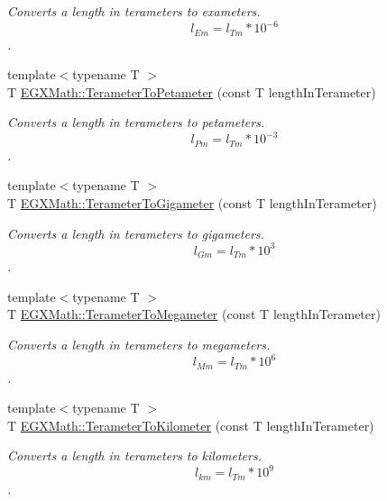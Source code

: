 \begin{DoxyCompactItemize}
\begin{DoxyCompactList}\small\item\em Converts a length in terameters to exameters. \[ l_{Em}=l_{Tm} * 10^{-6} \]. \end{DoxyCompactList}\item 
{\footnotesize template$<$typename T $>$ }\\T \mbox{\hyperlink{group___e_g_x_math-_conversions-_length_conversions-_s_i-_terameter-_s_i_ga0e5474db8b07f9fd87fa6539a02af527}{E\+G\+X\+Math\+::\+Terameter\+To\+Petameter}} (const T length\+In\+Terameter)
\begin{DoxyCompactList}\small\item\em Converts a length in terameters to petameters. \[ l_{Pm}=l_{Tm} * 10^{-3} \]. \end{DoxyCompactList}\item 
{\footnotesize template$<$typename T $>$ }\\T \mbox{\hyperlink{group___e_g_x_math-_conversions-_length_conversions-_s_i-_terameter-_s_i_gaf7d05e4ba6ba85ee7c75c65647178cb8}{E\+G\+X\+Math\+::\+Terameter\+To\+Gigameter}} (const T length\+In\+Terameter)
\begin{DoxyCompactList}\small\item\em Converts a length in terameters to gigameters. \[ l_{Gm}=l_{Tm} * 10^{3} \]. \end{DoxyCompactList}\item 
{\footnotesize template$<$typename T $>$ }\\T \mbox{\hyperlink{group___e_g_x_math-_conversions-_length_conversions-_s_i-_terameter-_s_i_gad4a32011802c13e60cc98081113d52c1}{E\+G\+X\+Math\+::\+Terameter\+To\+Megameter}} (const T length\+In\+Terameter)
\begin{DoxyCompactList}\small\item\em Converts a length in terameters to megameters. \[ l_{Mm}=l_{Tm} * 10^{6} \]. \end{DoxyCompactList}\item 
{\footnotesize template$<$typename T $>$ }\\T \mbox{\hyperlink{group___e_g_x_math-_conversions-_length_conversions-_s_i-_terameter-_s_i_ga3621654052e072519227ad628e03d68b}{E\+G\+X\+Math\+::\+Terameter\+To\+Kilometer}} (const T length\+In\+Terameter)
\begin{DoxyCompactList}\small\item\em Converts a length in terameters to kilometers. \[ l_{km}=l_{Tm} * 10^{9} \]. \end{DoxyCompactList}\item 

\end{DoxyCompactItemize}
